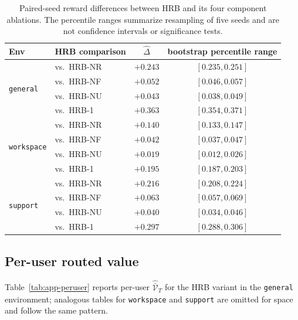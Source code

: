 \documentclass{article} %
\begin{document}
\begin{table}[h]
\centering
\small
\begin{tabular}{llcc}
\toprule
Env & HRB comparison & $\widehat\Delta$ & bootstrap percentile range \\
\midrule
\multirow{4}{*}{\texttt{general}}
 & vs.\ \textnormal{HRB-NR}         & $+0.243$ & $[0.235, 0.251]$ \\
 & vs.\ \textnormal{HRB-NF}      & $+0.052$ & $[0.046, 0.057]$ \\
 & vs.\ \textnormal{HRB-NU} & $+0.043$ & $[0.038, 0.049]$ \\
 & vs.\ \textnormal{HRB-1}         & $+0.363$ & $[0.354, 0.371]$ \\
\midrule
\multirow{4}{*}{\texttt{workspace}}
 & vs.\ \textnormal{HRB-NR}         & $+0.140$ & $[0.133, 0.147]$ \\
 & vs.\ \textnormal{HRB-NF}      & $+0.042$ & $[0.037, 0.047]$ \\
 & vs.\ \textnormal{HRB-NU} & $+0.019$ & $[0.012, 0.026]$ \\
 & vs.\ \textnormal{HRB-1}         & $+0.195$ & $[0.187, 0.203]$ \\
\midrule
\multirow{4}{*}{\texttt{support}}
 & vs.\ \textnormal{HRB-NR}         & $+0.216$ & $[0.208, 0.224]$ \\
 & vs.\ \textnormal{HRB-NF}      & $+0.063$ & $[0.057, 0.069]$ \\
 & vs.\ \textnormal{HRB-NU} & $+0.040$ & $[0.034, 0.046]$ \\
 & vs.\ \textnormal{HRB-1}         & $+0.297$ & $[0.288, 0.306]$ \\
\bottomrule
\end{tabular}
\caption{Paired-seed reward differences between HRB and its four component ablations. The percentile ranges
summarize resampling of five seeds and are not confidence intervals or
significance tests.}
\label{tab:app-bootstrap}
\end{table}

\subsection{Per-user routed value}

\label{app:tab-peruser}

Table~\ref{tab:app-peruser} reports per-user $\widehat{\bar{\mathcal V}}_T$ for the \textnormal{HRB} variant in the \texttt{general} environment; analogous tables for \texttt{workspace} and \texttt{support} are omitted for space and follow the same pattern.
\end{document}
